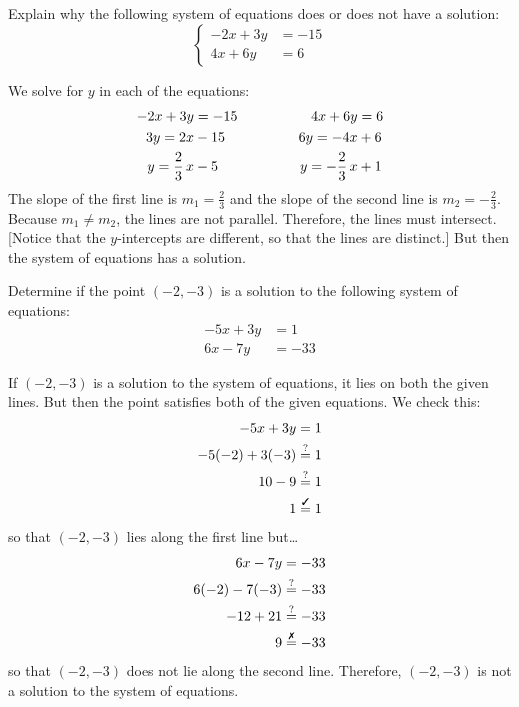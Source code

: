 \documentclass[11pt,letterpaper]{article}
\begin{document}

 Explain why the following system of equations does or does not have a solution:
	\[
	\left\{\begin{aligned}
	-2x + 3y&= -15 \\
	4x + 6y&= 6
	\end{aligned}\right.
	\] \pspace

\sol We solve for $y$ in each of the equations:
	\[
	\begin{aligned}
	-2x + 3y&= -15 &\hspace{1.5cm} 4x + 6y&= 6 \\
	3y= 2x &- 15 & 6y= -4x &+ 6 \\
	y= \frac{2}{3}\,x &- 5 & y= -\frac{2}{3}\,x &+ 1
	\end{aligned}
	\]
The slope of the first line is $m_1= \frac{2}{3}$ and the slope of the second line is $m_2= -\frac{2}{3}$. Because $m_1 \neq m_2$, the lines are not parallel. Therefore, the lines must intersect. [Notice that the $y$-intercepts are different, so that the lines are distinct.] But then the system of equations has a solution. 



\newpage



 Determine if the point $(-2, -3)$ is a solution to the following system of equations:
	\[
	\begin{aligned}
	-5x + 3y&= 1 \\
	6x - 7y&= -33
	\end{aligned}
	\] \pspace

\sol If $(-2, -3)$ is a solution to the system of equations, it lies on both the given lines. But then the point satisfies both of the given equations. We check this:
	\[
	\begin{aligned}
	-5x + 3y&= 1 \\
	-5(-2) + 3(-3)&\stackrel{?}{=} 1 \\
	10 - 9&\stackrel{?}{=} 1 \\
	1&\stackrel{\text{\cmark}}{=} 1
	\end{aligned}
	\]
so that $(-2, -3)$ lies along the first line but\dots
	\[
	\begin{aligned}
	6x - 7y&= -33 \\
	6(-2) - 7(-3)&\stackrel{?}{=} -33 \\
	-12 + 21&\stackrel{?}{=} -33 \\
	9&\stackrel{\text{\xmark}}{=} -33
	\end{aligned}
	\]
so that $(-2, -3)$ does not lie along the second line. Therefore, $(-2, -3)$ is not a solution to the system of equations. 
\end{document}
